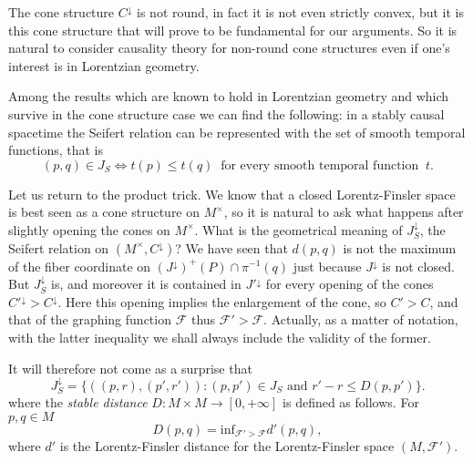 \documentclass[a4paper]{jpconf}
\theoremstyle{definition}
\theoremstyle{remark}
\begin{document}


The cone structure   $C^\downarrow$ is not round, in fact it is not even strictly convex, but it is this cone structure that will prove to be fundamental for our arguments. So it is natural to consider causality theory for non-round cone structures even if one's interest is in Lorentzian geometry.



Among the results which are known to hold in Lorentzian geometry \cite{minguzzi09c} and which survive in the cone structure case \cite{bernard16,minguzzi17} we can find the following: in a stably causal spacetime the Seifert relation can be represented with the set of smooth temporal functions, that is
\begin{equation} \label{rep}
(p,q)\in J_S\Leftrightarrow t(p)\le t(q) \ \textrm{ for every smooth temporal function } \ t.
\end{equation}

Let us return to the product trick. We know that a closed Lorentz-Finsler space is best seen as a cone structure on $M^\times$, so it is natural to ask what happens after  slightly opening the cones on $M^\times$. What is the geometrical meaning of $J^\downarrow_S$, the Seifert relation on $(M^\times, C^\downarrow)$? We have seen that $d(p,q)$ is not the maximum of the fiber coordinate on $(J^\downarrow)^+(P)\cap \pi^{-1}(q)$ just because $J^\downarrow$ is not closed. But $J^\downarrow_S$ is, and moreover it is contained in $J'{}^\downarrow$ for every opening of the cones  $C'{}^\downarrow>C^\downarrow$. Here this opening implies the enlargement of the cone, so $C'>C$, and that of the graphing function $\mathscr{F}$ thus $\mathscr{F}'>\mathscr{F}$. Actually, as a matter of notation, with the latter inequality we shall always include the validity of  the former.

It will therefore not come as a surprise that
\begin{equation} \label{vyv}
J_S^\downarrow=\{((p,r),(p',r'))\colon (p,p')\in J_S \textrm{ and } r'-r \le D(p,p')\}.
\end{equation}
where
the {\em stable distance} $D\colon M\times M\to [0,+\infty]$ is defined as follows. For $p,q\in M$
\begin{equation}
D(p,q)=\mathrm{inf}_{\mathscr{F}'>\mathscr{F}} d'(p,q),
\end{equation}
where $d'$ is the Lorentz-Finsler distance for the  Lorentz-Finsler space $(M,\mathscr{F}')$.
\end{document}
